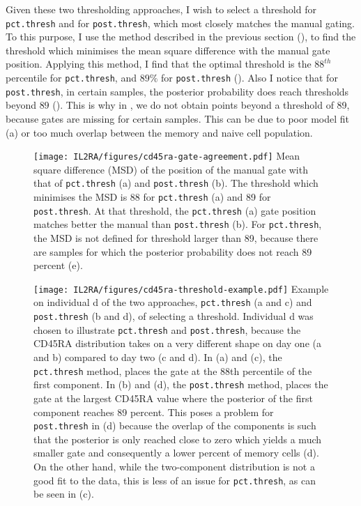 Given these two thresholding approaches, I wish to select a threshold for \texttt{pct.thresh} and for \texttt{post.thresh}, which most closely matches the manual gating.
To this purpose, I use the method described in the previous section (), to find the threshold which minimises the mean square difference with the manual gate position.
Applying this method, I find that the optimal threshold is the $88^{th}$ percentile for \texttt{pct.thresh},
and $89\%$ for \texttt{post.thresh} ().
Also I notice that for \texttt{post.thresh}, in certain samples,  the posterior probability does reach thresholds beyond $89$ ().
This is why in , we do not obtain points beyond a threshold of 89, because gates are missing for certain samples.
This can be due to poor model fit (a) or too much overlap between the memory and naive cell population.

\begin{figure}[h]
\centering
  \texttt{[image: IL2RA/figures/cd45ra-gate-agreement.pdf]}
{ Mean square difference (MSD) of the position of the manual gate with that of \texttt{pct.thresh} (a) and \texttt{post.thresh} (b). }
{
  The threshold which minimises the MSD is 88 for \texttt{pct.thresh} (a) and 89 for \texttt{post.thresh}.
  At that threshold, the \texttt{pct.thresh} (a) gate position matches better the manual than \texttt{post.thresh} (b).
  For \texttt{pct.thresh}, the MSD is not defined for threshold larger than 89,
  because there are samples for which the posterior probability does not reach 89 percent (e).
}
\end{figure}

\begin{figure}[h]
\centering
  \texttt{[image: IL2RA/figures/cd45ra-threshold-example.pdf]}
{ Example on individual d of the two approaches, \texttt{pct.thresh} (a and c) and \texttt{post.thresh} (b and d), of selecting a threshold. }
{
  Individual d was chosen to illustrate \texttt{pct.thresh} and \texttt{post.thresh}, because
  the CD45RA distribution takes on a very different shape on day one (a and b) compared to day two (c and d).
  In (a) and (c), the \texttt{pct.thresh} method, places the gate at the 88th percentile of the first component.
  In (b) and (d), the \texttt{post.thresh} method, places the gate at the largest CD45RA value where the posterior of the first component reaches 89 percent.
  This poses a problem for \texttt{post.thresh} in (d) because the overlap of the components is such that the posterior is only reached close to zero
  which yields a much smaller gate and consequently a lower percent of memory cells (d).
  On the other hand, while the two-component distribution is not a good fit to the data, this is less of an issue for \texttt{pct.thresh}, as can be seen in (c).
}
\end{figure}

